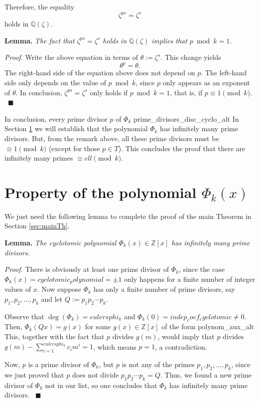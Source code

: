 \documentclass[a4paper, 12pt]{article}
\theoremstyle{definition}
\newcommand{\Z}{\mathbb{Z}}
\newcommand{\Q}{\mathbb{Q}}
\DeclareMathOperator{\degpol}{deg} %
\begin{document}
Therefore, the equality
\begin{equation}\label{eq:equality_in_zeta}
\zeta^{ps}=\zeta^{s}
\end{equation}
holds in $\Q(\zeta)$. 

\textbf{Lemma.} \emph{The fact that $\zeta^{ps}=\zeta^{s}$ holds in $\Q(\zeta)$ implies that $p \bmod{{k}}=1$.}

\textit{Proof.} Write the above equation in terms of $\theta:=\zeta^{s}$. This change yields
\begin{equation*}
\theta^{p}=\theta.
\end{equation*}
The right-hand side of the equation above does not depend on $p$. The left-hand side only depends on the value of $p\bmod{{k}}$, since $p$ only appears as an exponent of $\theta$. In conclusion, $\zeta^{ps}=\zeta^{s}$ only holds if $p \bmod{{k}}=1$, that is, if $p\equiv 1\pmod{{k}}$. \ $\blacksquare$

In conclusion, every prime divisor $p$ of $\Phi_{{k}}$ {prime_divisors_disc_cyclo_alt} In Section \ref{sec:properties} we will establish that the polynomial $\Phi_{{k}}$ has infinitely many prime divisors. But, from the remark above, all these prime divisors must be $\equiv 1\pmod{{k}}$ (except for those $p\in T$). This concludes the proof that there are infinitely many primes $\equiv {ell} \pmod{{k}}$.

\section{Property of the polynomial \texorpdfstring{$\Phi_{{k}}(x)$}{Pkx}}\label{sec:properties}

We just need the following lemma to complete the proof of the main Theorem in Section \ref{sec:mainTh}.

\textbf{Lemma.} \emph{The cyclotomic polynomial $\Phi_{{k}}(x)\in\Z[x]$ has infinitely many prime divisors.}

\textit{Proof.} There is obviously at least one prime divisor of $\Phi_{{k}}$, since the case $\Phi_{{k}}(x)={cyclotomic_polynomial}=\pm 1$ only happens for a finite number of integer values of $x$. Now suppose $\Phi_{{k}}$ has only a finite number of prime divisors, say $p_1, p_2,\dots,p_k$ and let $Q:=p_1p_2\cdots p_k$. 

Observe that $\degpol(\Phi_{{k}})={eulersphi_k}$ and $\Phi_{{k}}(0)={indep_coef_cyclotomic}\neq 0$. Then, $\Phi_{{k}}(Qx)=g(x)$ for some $g(x)\in\Z[x]$ of the form {polynom_aux_alt} This, together with the fact that $p$ divides $g(m)$, would imply that $p$ divides $g(m) - \sum_{i=1}^{{eulersphi_k}}c_im^i=1$, which means $p=1$, a contradiction. 

Now, $p$ is a prime divisor of $\Phi_{{k}}$, but $p$ is not any of the primes $p_1,p_2,\dots,p_k$, since we just proved that $p$ does not divide $p_1p_2\cdots p_k=Q$. Thus, we found a new prime divisor of $\Phi_{{k}}$ not in our list, so one concludes that $\Phi_{{k}}$ has infinitely many prime divisors. \ $\blacksquare$
\end{document}
